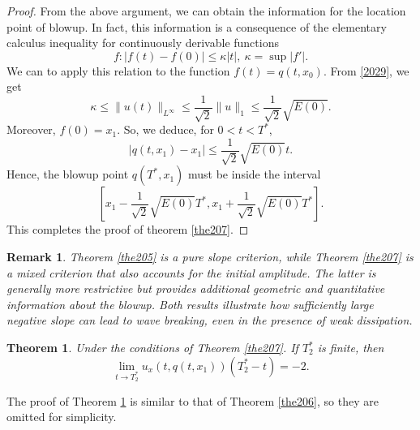 \documentclass[preprint,12pt]{elsarticle}
\numberwithin{equation}{section}
\newtheorem{theorem}{Theorem}[section]
\newtheorem{remark}{Remark}[section]
\begin{document}
\begin{proof}
From the above argument, we can obtain the information for the location point of blowup. In fact, this information is a consequence of the elementary calculus inequality for continuously derivable functions
$$f: |f(t)- f(0)| \leq \kappa |t|,\ \kappa=\sup |f'|.$$
We can to apply this relation to the function $f(t)=q(t,x_0)$.
From \eqref{2029}, we get
$$\kappa\leq \|u(t)\|_{L^{\infty}}\leq \frac{1}{\sqrt 2}\|u\|_{1}\leq\frac{1}{\sqrt 2}\sqrt{E(0)}.$$
Moreover, $f(0)=x_1$.
So, we deduce, for $0<t<T^{*}$,
$$|q(t,x_1)-x_1|\leq\frac{1}{\sqrt 2}\sqrt{E(0)}t.$$
Hence, the blowup point $q(T^{*},x_1)$ must be inside the interval
$$\left[x_{1}-\frac{1}{\sqrt 2}\sqrt{E(0)}T^{*},
x_{1}+\frac{1}{\sqrt 2}\sqrt{E(0)}T^{*}\right].$$
This completes the proof of theorem \ref{the207}.
\end{proof}
\begin{remark}
Theorem \ref{the205} is a pure slope criterion, while Theorem \ref{the207} is a mixed criterion that also accounts for the initial amplitude. The latter is generally more restrictive but provides additional geometric and quantitative information about the blowup. Both results illustrate how sufficiently large negative slope can lead to wave breaking, even in the presence of weak dissipation.
\end{remark}

\begin{theorem}
\label{the208}
Under the conditions of Theorem \ref{the207}. If $T_{2}^{\ast}$ is finite, then
\begin{equation*}
\lim_{t\rightarrow T_{2}^{\ast}}u_{x}(t,q(t,x_{1}))(T_{2}^{\ast}-t)=-2.
\end{equation*}
\end{theorem}

The proof of Theorem \ref{the208} is similar to that of Theorem \ref{the206}, so
they are omitted for simplicity.
\end{document}
